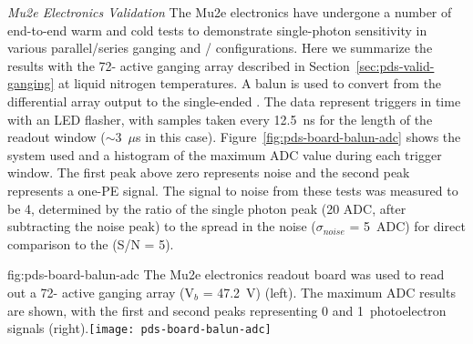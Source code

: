 \textit{Mu2e Electronics Validation}
The Mu2e electronics have undergone a number of end-to-end warm and cold tests to demonstrate single-photon sensitivity in various parallel/series ganging and / configurations. Here we summarize the results with the 72- active ganging array described in Section~\ref{sec:pds-valid-ganging}
at liquid nitrogen temperatures. 
A balun is used to convert from the differential  array output to the single-ended . The data represent triggers in time with an LED flasher, with samples taken every 12.5~ns for the length of the readout window ($\sim$3~$\mu$s in this case). Figure~\ref{fig:pds-board-balun-adc} shows the system used and a histogram of the maximum ADC value during each trigger window. The first peak above zero represents noise and the second peak represents a one-PE signal. The signal to noise from these tests was measured to be 4, determined by the ratio of the single photon peak (20 ADC, after subtracting the noise peak) to the spread in the noise ($\sigma_{noise}$ = 5~ADC) for direct comparison to the  (S/N = 5).

\begin{dunefigure}
{fig:pds-board-balun-adc}
{The Mu2e electronics readout board was used to read out a 72- active ganging array (V$_b$ = \SI{47.2}{V}) (left). The maximum ADC results are shown, with the first and second peaks representing 0 and 1~photoelectron signals (right).}\texttt{[image: pds-board-balun-adc]} 
\vspace{-7.0cm}
\end{dunefigure}


